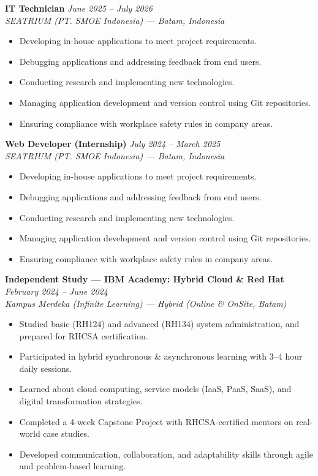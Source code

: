 \documentclass[a4paper,11pt]{article}
\begin{document}
\vspace{6pt}

\textbf{IT Technician} \hfill \textit{June 2025 -- July 2026} \\
\textit{SEATRIUM (PT. SMOE Indonesia) --- Batam, Indonesia}
\begin{itemize}[leftmargin=*, nosep, topsep=2pt]
  \item Developing in-house applications to meet project requirements.
  \item Debugging applications and addressing feedback from end users.
  \item Conducting research and implementing new technologies.
  \item Managing application development and version control using Git repositories.
  \item Ensuring compliance with workplace safety rules in company areas.
\end{itemize}

\vspace{6pt}

\textbf{Web Developer (Internship)} \hfill \textit{July 2024 -- March 2025} \\
\textit{SEATRIUM (PT. SMOE Indonesia) --- Batam, Indonesia}
\begin{itemize}[leftmargin=*, nosep, topsep=2pt]
  \item Developing in-house applications to meet project requirements.
  \item Debugging applications and addressing feedback from end users.
  \item Conducting research and implementing new technologies.
  \item Managing application development and version control using Git repositories.
  \item Ensuring compliance with workplace safety rules in company areas.
\end{itemize}

\vspace{6pt}

\textbf{Independent Study --- IBM Academy: Hybrid Cloud \& Red Hat} \hfill \textit{February 2024 -- June 2024} \\
\textit{Kampus Merdeka (Infinite Learning) --- Hybrid (Online \& OnSite, Batam)}
\begin{itemize}[leftmargin=*, nosep, topsep=2pt]
  \item Studied basic (RH124) and advanced (RH134) system administration, and prepared for RHCSA certification.
  \item Participated in hybrid synchronous \& asynchronous learning with 3--4 hour daily sessions.
  \item Learned about cloud computing, service models (IaaS, PaaS, SaaS), and digital transformation strategies.
  \item Completed a 4-week Capstone Project with RHCSA-certified mentors on real-world case studies.
  \item Developed communication, collaboration, and adaptability skills through agile and problem-based learning.
\end{itemize}
\end{document}
